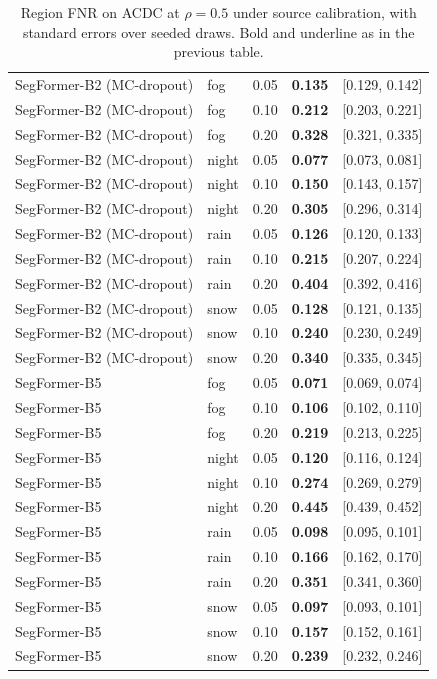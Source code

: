 \begin{table}[t]
\begin{tabular}{llccc}
SegFormer-B2 (MC-dropout) & fog & 0.05 & \textbf{0.135} & [0.129, 0.142] \\
SegFormer-B2 (MC-dropout) & fog & 0.10 & \textbf{0.212} & [0.203, 0.221] \\
SegFormer-B2 (MC-dropout) & fog & 0.20 & \textbf{0.328} & [0.321, 0.335] \\
SegFormer-B2 (MC-dropout) & night & 0.05 & \textbf{0.077} & [0.073, 0.081] \\
SegFormer-B2 (MC-dropout) & night & 0.10 & \textbf{0.150} & [0.143, 0.157] \\
SegFormer-B2 (MC-dropout) & night & 0.20 & \textbf{0.305} & [0.296, 0.314] \\
SegFormer-B2 (MC-dropout) & rain & 0.05 & \textbf{0.126} & [0.120, 0.133] \\
SegFormer-B2 (MC-dropout) & rain & 0.10 & \textbf{0.215} & [0.207, 0.224] \\
SegFormer-B2 (MC-dropout) & rain & 0.20 & \textbf{0.404} & [0.392, 0.416] \\
SegFormer-B2 (MC-dropout) & snow & 0.05 & \textbf{0.128} & [0.121, 0.135] \\
SegFormer-B2 (MC-dropout) & snow & 0.10 & \textbf{0.240} & [0.230, 0.249] \\
SegFormer-B2 (MC-dropout) & snow & 0.20 & \textbf{0.340} & [0.335, 0.345] \\
SegFormer-B5 & fog & 0.05 & \textbf{0.071} & [0.069, 0.074] \\
SegFormer-B5 & fog & 0.10 & \textbf{0.106} & [0.102, 0.110] \\
SegFormer-B5 & fog & 0.20 & \textbf{0.219} & [0.213, 0.225] \\
SegFormer-B5 & night & 0.05 & \textbf{0.120} & [0.116, 0.124] \\
SegFormer-B5 & night & 0.10 & \textbf{0.274} & [0.269, 0.279] \\
SegFormer-B5 & night & 0.20 & \textbf{0.445} & [0.439, 0.452] \\
SegFormer-B5 & rain & 0.05 & \textbf{0.098} & [0.095, 0.101] \\
SegFormer-B5 & rain & 0.10 & \textbf{0.166} & [0.162, 0.170] \\
SegFormer-B5 & rain & 0.20 & \textbf{0.351} & [0.341, 0.360] \\
SegFormer-B5 & snow & 0.05 & \textbf{0.097} & [0.093, 0.101] \\
SegFormer-B5 & snow & 0.10 & \textbf{0.157} & [0.152, 0.161] \\
SegFormer-B5 & snow & 0.20 & \textbf{0.239} & [0.232, 0.246] \\
\bottomrule
\end{tabular}
\caption{Region FNR on ACDC at $\rho=0.5$ under source calibration, with standard errors over seeded draws. Bold and underline as in the previous table.}
\label{tab:uncertainty_breakdown}
\end{table}
